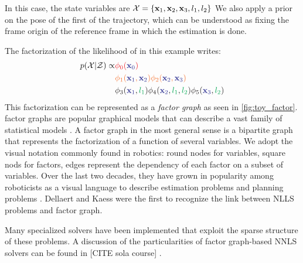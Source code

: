 In this case, the state variables are $\mathcal{X} = \{ {\bf x}_1, {\bf x}_2, {\bf x}_3, l_1, l_2\}$ %
We also apply a prior on the pose of the first \keyframe of the trajectory, which can be understood as fixing the frame origin of the reference 
frame in which the estimation is done.

The factorization of the likelihood of  in this example writes:
%
\begin{align}
    p(\mathcal{X} | \mathcal{Z}) \propto 
    &{\color{Red} \phi_0({\color{Blue} \bfx_{0}})} \\ 
    &{\color{Orange} \phi_1({\color{Blue} \bfx_1}, {\color{Blue} \bfx_2}) \phi_2({\color{Blue} \bfx_2}, {\color{Blue} \bfx_3})} \\ 
    &{\color{Black} \phi_3({\color{Blue} \bfx_1}, {\color{Green} l_1}) \phi_4({\color{Blue} \bfx_2}, {\color{Green} l_1}, {\color{Green} l_2}) \phi_5({\color{Blue} \bfx_3}, {\color{Green} l_2})} \\ 
\end{align}
%
This factorization can be represented as a \textit{factor graph} as seen in \ref{fig:toy_factor}. 
factor graphs are popular graphical models \cite{koller2009probabilistic} that can describe a vast family of statistical models \cite{loeliger2004introduction}.
A factor graph in the most general sense is a bipartite graph that represents the factorization of a function of several variables. 
We adopt the visual notation commonly found in robotics: round nodes for variables, square nods for factors, edges represent the dependency 
of each factor on a subset of variables. Over the last two decades, they have grown in popularity among roboticists as a visual language to describe 
estimation problems \cite{dellaert2017factor} and planning problems \cite{dong2016motion}. Dellaert and Kaess \cite{dellaert2006square} were the first to
recognize the link between NLLS problems and factor graph.

Many specialized solvers \cite{grisetti2011g2o, dellaert2012factor, ila2017slam++} have been implemented that exploit the sparse structure of these 
problems. A discussion of the particularities of factor graph-based NNLS solvers can be found in [CITE sola course] \cite{dellaert2017factor}.


